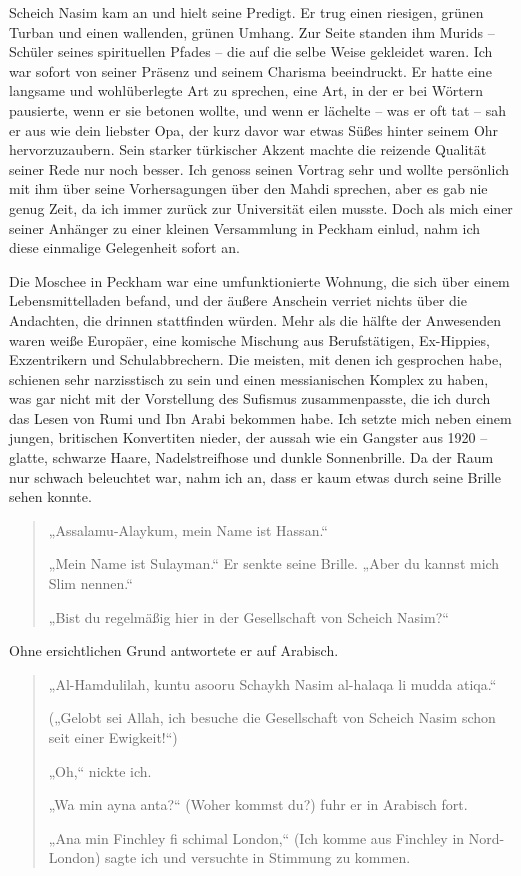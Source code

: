 \documentclass[12pt]{memoir}
\def\–{\hskip0pt-\hskip0pt}
\begin{document}
Scheich Nasim kam an und hielt seine Predigt.
Er trug einen riesigen, grünen Turban und einen wallenden, grünen Umhang.
Zur Seite standen ihm Murids – Schüler seines spirituellen Pfades –
die auf die selbe Weise gekleidet waren.
Ich war sofort von seiner Präsenz und seinem Charisma beeindruckt.
Er hatte eine langsame und wohlüberlegte Art zu sprechen, eine Art,
in der er bei Wörtern pausierte, wenn er sie betonen wollte,
und wenn er lächelte – was er oft tat – sah er aus wie dein liebster Opa,
der kurz davor war etwas Süßes hinter seinem Ohr hervorzuzaubern.
Sein starker türkischer Akzent machte die reizende Qualität
seiner Rede nur noch besser.
Ich genoss seinen Vortrag sehr und wollte persönlich mit ihm
über seine Vorhersagungen über den Mahdi sprechen,
aber es gab nie genug Zeit, da ich immer zurück zur Universität eilen musste.
Doch als mich einer seiner Anhänger
zu einer kleinen Versammlung in Peckham einlud,
nahm ich diese einmalige Gelegenheit sofort an.

Die Moschee in Peckham war eine umfunktionierte Wohnung,
die sich über einem Lebensmittelladen befand,
und der äußere Anschein verriet nichts über die Andachten,
die drinnen stattfinden würden.
Mehr als die hälfte der Anwesenden waren weiße Europäer,
eine komische Mischung aus Berufstätigen,
Ex\–Hippies, Exzentrikern und Schulabbrechern.
Die meisten, mit denen ich gesprochen habe,
schienen sehr narzisstisch zu sein und einen messianischen Komplex zu haben,
was gar nicht mit der Vorstellung des Sufismus zusammenpasste,
die ich durch das Lesen von Rumi und Ibn Arabi bekommen habe.
Ich setzte mich neben einem jungen, britischen Konvertiten nieder,
der aussah wie ein Gangster aus 1920 –
glatte, schwarze Haare, Nadelstreifhose und dunkle Sonnenbrille.
Da der Raum nur schwach beleuchtet war, nahm ich an,
dass er kaum etwas durch seine Brille sehen konnte.

\begin{quote}
„Assalamu-Alaykum, mein Name ist Hassan.“

„Mein Name ist Sulayman.“
Er senkte seine Brille.
„Aber du kannst mich Slim nennen.“

„Bist du regelmäßig hier in der Gesellschaft von Scheich Nasim?“
\end{quote}

Ohne ersichtlichen Grund antwortete er auf Arabisch.

\begin{quote}
„Al-Hamdulilah, kuntu asooru Schaykh Nasim al-halaqa li mudda atiqa.“

(„Gelobt sei Allah, ich besuche die Gesellschaft von Scheich Nasim
schon seit einer Ewigkeit!“)

„Oh,“ nickte ich.

„Wa min ayna anta?“ (Woher kommst du?) fuhr er in Arabisch fort.

„Ana min Finchley fi schimal London,“
(Ich komme aus Finchley in Nord-London)
sagte ich und versuchte in Stimmung zu kommen.
\end{quote}
\end{document}
